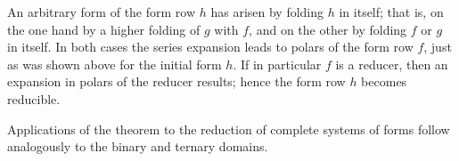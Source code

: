 \documentclass[11pt]{article}
\begin{document}
An arbitrary form of the form row $h$ has arisen by folding $h$ in itself; that is, on the one hand by a higher folding of $g$ with $f$, and on the other by folding $f$ or $g$ in itself. In both cases the series expansion leads to polars of the form row $f$, just as was shown above for the initial form $h$. If in particular $f$ is a reducer, then an expansion in polars of the reducer results; hence the form row $h$ becomes reducible.

Applications of the theorem to the reduction of complete systems of forms follow analogously to the binary and ternary domains.
\end{document}
